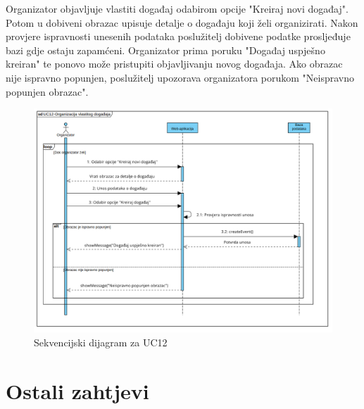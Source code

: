 				\noindent Organizator objavljuje vlastiti događaj odabirom opcije "Kreiraj novi događaj".
				Potom u dobiveni obrazac upisuje detalje o događaju koji želi organizirati. Nakon provjere ispravnosti unesenih podataka
				poslužitelj dobivene podatke prosljeđuje bazi gdje ostaju zapamćeni.
				Organizator prima poruku "Događaj uspješno kreiran" te ponovo može pristupiti objavljivanju novog događaja.
				Ako obrazac nije ispravno popunjen, poslužitelj upozorava organizatora porukom "Neispravno popunjen obrazac".
		\newpage
				\begin{figure}[htbp]
					\centering
					\includegraphics[width=1\textwidth]{dijagrami/UC12-Organizacija_vlastitog_dogadaja.png}
					\caption{Sekvencijski dijagram za UC12}
				\label{fig:my_image}
				\end{figure}
		\newpage
     \eject
	
		\section{Ostali zahtjevi}
			 
